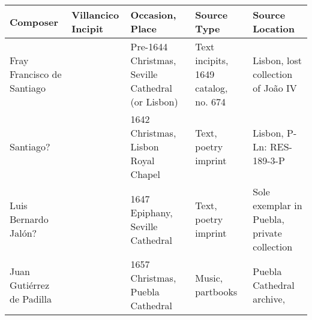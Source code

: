 \documentclass[table]{vcbook-float}
\begin{document}
\begin{tabulary}{\textwidth}{LLLLL}
    \toprule
    Composer & Villancico Incipit & Occasion, Place & Source Type & Source
    Location \\ \midrule
    
    Fray Francisco de Santiago & 
     &
    Pre-1644 Christmas, Seville Cathedral (or Lisbon) &
    Text incipits, 1649 catalog, no. 674 &
    Lisbon, lost collection of João IV \\

    Santiago? & 
     & 
    1642 Christmas, Lisbon Royal Chapel &
    Text, poetry imprint &
    Lisbon, P-Ln: RES-189-3-P \\

    Luis Bernardo Jalón? & 
     & 
    1647 Epiphany, Seville Cathedral & 
    Text, poetry imprint & 
    Sole exemplar in Puebla, private collection \\

    Juan Gutiérrez de Padilla & 
     & 
    1657 Christmas, Puebla Cathedral & 
    Music, partbooks & 
    Puebla Cathedral archive,  \\
    \bottomrule
\end{tabulary}
\end{document}

